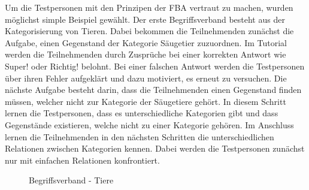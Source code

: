 Um die Testpersonen mit den Prinzipen der \ac{FBA} vertraut zu machen, wurden möglichst simple Beispiel gewählt.
Der erste Begriffsverband besteht aus der Kategorisierung von Tieren.
Dabei bekommen die Teilnehmenden zunächst die Aufgabe, einen Gegenstand der Kategorie Säugetier zuzuordnen.
Im Tutorial werden die Teilnehmenden durch Zusprüche bei einer korrekten Antwort wie \glqq Super!\grqq{} oder \glqq Richtig!\grqq{} belohnt.
Bei einer falschen Antwort werden die Testpersonen über ihren Fehler aufgeklärt und dazu motiviert, es erneut zu versuchen.
Die nächste Aufgabe besteht darin, dass die Teilnehmenden einen Gegenstand finden müssen, welcher nicht zur Kategorie der Säugetiere gehört.
In diesem Schritt lernen die Testpersonen, dass es unterschiedliche Kategorien gibt und dass Gegenstände existieren, welche nicht zu einer Kategorie gehören.
Im Anschluss lernen die Teilnehmenden in den nächsten Schritten die unterschiedlichen Relationen zwischen Kategorien kennen.
Dabei werden die Testpersonen zunächst nur mit einfachen Relationen konfrontiert.\\

\begin{figure}[!ht]
    \centering
    \caption{\label{fig:begriffsverband-tiere}Begriffsverband - Tiere}
\end{figure}

